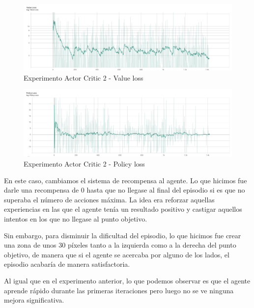 \begin{figure}[H]
	\centering
	\includegraphics[width=1\textwidth]{figuras/experiments/actor_critic/actor_critic_no_rewards_till_complete/value_loss.png}
	\caption[Experimento Actor Critic 2 - Duración de los episodios]{Experimento Actor Critic 2 - Value loss}
	\label{fig-experimento-actor-critic-2-value-loss}
\end{figure}
\begin{figure}[H]
	\centering
	\includegraphics[width=1\textwidth]{figuras/experiments/actor_critic/actor_critic_no_rewards_till_complete/policy_loss.png}
	\caption[Experimento Actor Critic 2 - Duración de los episodios]{Experimento Actor Critic 2 - Policy loss}
	\label{fig-experimento-actor-critic-2-policy-loss}
\end{figure}

En este caso, cambiamos el sistema de recompensa al agente. Lo que hicimos fue darle una recompensa de 0 hasta que no llegase al final del episodio si es que no superaba el número de acciones máxima. La idea era reforzar aquellas experiencias en las que el agente tenía un resultado positivo y castigar aquellos intentos en los que no llegase al punto objetivo.
\medskip

Sin embargo, para disminuir la dificultad del episodio, lo que hicimos fue crear una zona de unos 30 píxeles tanto a la izquierda como a la derecha del punto objetivo, de manera que si el agente se acercaba por alguno de los lados, el episodio acabaría de manera satisfactoria.
\medskip

Al igual que en el experimento anterior, lo que podemos observar es que el agente aprende rápido durante las primeras iteraciones pero luego no se ve ninguna mejora significativa. 
\medskip

